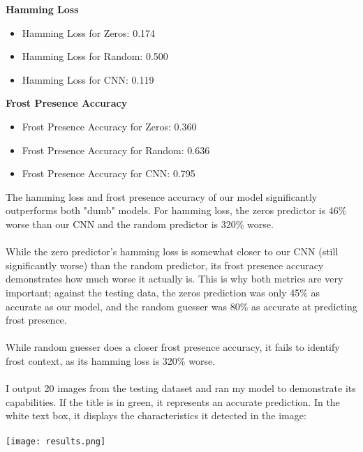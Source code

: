 \documentclass[11pt]{article}
\begin{document}
\textbf{Hamming Loss}
\begin{itemize}
    \item Hamming Loss for Zeros: 0.174
    \item Hamming Loss for Random: 0.500
    \item Hamming Loss for CNN: 0.119
\end{itemize}
\textbf{Frost Presence Accuracy}
\begin{itemize}
    \item Frost Presence Accuracy for Zeros: 0.360
    \item Frost Presence Accuracy for Random: 0.636
    \item Frost Presence Accuracy for CNN: 0.795
\end{itemize}
The hamming loss and frost presence accuracy of our model significantly outperforms both "dumb" models. For hamming loss, the zeros predictor is 46\% worse than our CNN and the random predictor is 320\% worse. \\\\
While the zero predictor's hamming loss is somewhat closer to our CNN (still significantly worse) than the random predictor, its frost presence accuracy demonstrates how much worse it actually is. This is why both metrics are very important; against the testing data, the zeros prediction was only 45\% as accurate as our model, and the random guesser was 80\% as accurate at predicting frost presence. \\\\
While random guesser does a closer frost presence accuracy, it fails to identify frost context, as its hamming loss is 320\% worse. \\\\
I output 20 images from the testing dataset and ran my model to demonstrate its capabilities. If the title is in green, it represents an accurate prediction. In the white text box, it displays the characteristics it detected in the image:\\\\
\texttt{[image: results.png]}
\end{document}

